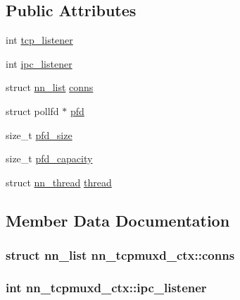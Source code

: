 \subsection*{Public Attributes}
\begin{DoxyCompactItemize}
\item 
int \hyperlink{structnn__tcpmuxd__ctx_a9a748562695c46e091f4179545f49a0c}{tcp\+\_\+listener}
\item 
int \hyperlink{structnn__tcpmuxd__ctx_a2215431c53f0d16c394112898f08c68c}{ipc\+\_\+listener}
\item 
struct \hyperlink{structnn__list}{nn\+\_\+list} \hyperlink{structnn__tcpmuxd__ctx_a59e9fb3663462acff2e91ff659656f1d}{conns}
\item 
struct pollfd $\ast$ \hyperlink{structnn__tcpmuxd__ctx_ae561c5e942bb5d994f932164a001cac0}{pfd}
\item 
size\+\_\+t \hyperlink{structnn__tcpmuxd__ctx_a030af965b1ecc68131d5b23df5ccd705}{pfd\+\_\+size}
\item 
size\+\_\+t \hyperlink{structnn__tcpmuxd__ctx_a5a5fb79c99e503b6b8acf8cff8ece82b}{pfd\+\_\+capacity}
\item 
struct \hyperlink{structnn__thread}{nn\+\_\+thread} \hyperlink{structnn__tcpmuxd__ctx_a0f353434edac1a6057af1b50905447be}{thread}
\end{DoxyCompactItemize}


\subsection{Member Data Documentation}
\subsubsection[{conns}]{\setlength{\rightskip}{0pt plus 5cm}struct {\bf nn\+\_\+list} nn\+\_\+tcpmuxd\+\_\+ctx\+::conns}\hypertarget{structnn__tcpmuxd__ctx_a59e9fb3663462acff2e91ff659656f1d}{}\label{structnn__tcpmuxd__ctx_a59e9fb3663462acff2e91ff659656f1d}
\subsubsection[{ipc\+\_\+listener}]{\setlength{\rightskip}{0pt plus 5cm}int nn\+\_\+tcpmuxd\+\_\+ctx\+::ipc\+\_\+listener}\hypertarget{structnn__tcpmuxd__ctx_a2215431c53f0d16c394112898f08c68c}{}\label{structnn__tcpmuxd__ctx_a2215431c53f0d16c394112898f08c68c}
